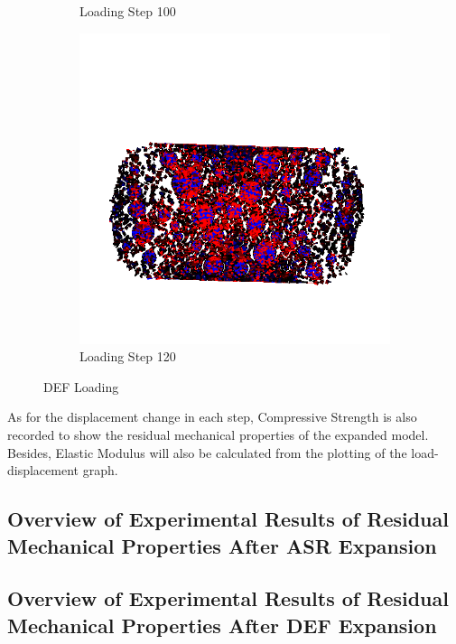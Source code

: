 \begin{figure}[ht]
\begin{subfigure}{.33\textwidth}
      \caption{Loading Step 100}
      \end{subfigure}%
      \begin{subfigure}{.33\textwidth}
        \centering
        \includegraphics[width=1.0\linewidth]{Files/A30X-5C_3_IS/DEP50-STEP(120).png}
        \caption{Loading Step 120}
      \end{subfigure}

  \caption{DEF Loading}
  \label{fig:DEF_Loading}
\end{figure}


As for the displacement change in each step, Compressive Strength is also recorded to show the residual mechanical properties of the expanded model. Besides, Elastic Modulus will also be calculated from the plotting of the load-displacement graph.


\subsection{Overview of Experimental Results of Residual Mechanical Properties After ASR Expansion}

\subsection{Overview of Experimental Results of Residual Mechanical Properties After DEF Expansion}
